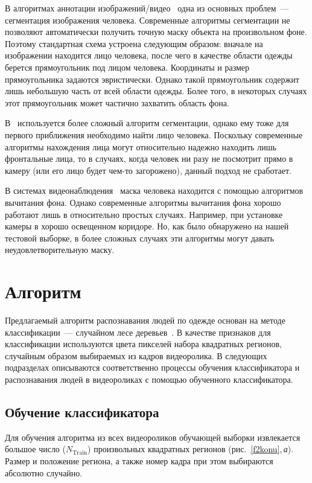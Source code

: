 \begin{multicols}{2}
В алгоритмах аннотации изображений/видео~\cite{3konu, 5konu} одна из основных проблем~--- 
сегментация изоб\-ра\-же\-ния человека. Современные алгоритмы сегментации не позволяют 
автоматически получить точную маску объекта на произвольном фоне. Поэтому стандартная 
схема устроена следующим образом: вначале на изображении находится лицо человека, после 
чего в качестве области одежды берется прямоугольник под лицом человека. Координаты и 
размер прямоугольника задаются эвристически. Однако такой прямоугольник содержит лишь 
небольшую часть от всей области одежды. Более того, в некоторых случаях этот прямоугольник 
может час\-тич\-но захватить область фона. 

В~\cite{1konu} используется более сложный алгоритм сегментации, однако ему тоже для первого 
приближения необходимо найти лицо человека. Поскольку современные алгоритмы нахождения 
лица могут относительно надежно находить лишь фронтальные лица, то в случаях, когда человек 
ни разу не посмотрит прямо в камеру (или его лицо будет чем-то загорожено), данный подход не 
сработает.

В системах видеонаблюдения~\cite{4konu, 8konu} маска человека находится с помощью 
алгоритмов вычитания фона. Однако современные алгоритмы вычитания фона хорошо работают 
лишь в относительно прос\-тых случаях. Например, при установке камеры в хорошо освещенном 
коридоре. Но, как было обнаружено на нашей тестовой выборке, в более сложных случаях эти 
алгоритмы могут давать неудовлетворительную маску.


\section{Алгоритм}

Предлагаемый алгоритм распознавания людей по одежде основан на методе классификации~--- 
случайном лесе деревьев~\cite{2konu}. В качестве признаков для классификации используются 
цвета пикселей набора квадратных регионов, случайным образом выбираемых из кадров 
видеоролика. В следующих подразделах описываются соответственно процессы обучения 
классификатора и распознавания людей в видеороликах с помощью обученного классификатора.

\subsection{Обучение классификатора}

Для обучения алгоритма из всех видеороликов обучающей выборки извлекается большое чис\-ло 
($N_{\mathrm{Train}}$) произвольных квадратных регионов (рис.~\ref{f2konu},\,\textit{а}). Размер и 
положение региона, а также номер кадра при этом выбираются абсолютно случайно. 


\end{multicols}
